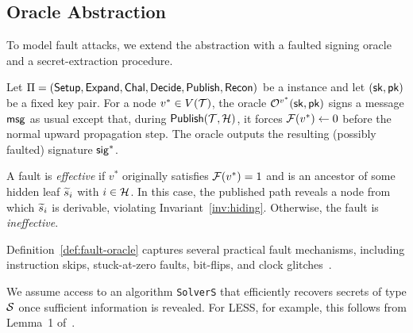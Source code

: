\subsection{Oracle Abstraction}
\label{sec:oracle}

To model fault attacks, we extend the \GZKST abstraction with a faulted signing oracle and a secret-extraction procedure.

\begin{definition}
\label{def:fault-oracle}
Let $\Pi=(\mathsf{Setup},\mathsf{Expand},\mathsf{Chal},\mathsf{Decide},\allowbreak
\mathsf{Publish},\allowbreak\mathsf{Recon})$ be a \GZKST
instance and let $(\mathsf{sk},\mathsf{pk})$ be a fixed key pair. For a node
$v^*\in V(\mathcal{T})$, the oracle $\mathcal{O}^{v^*}(\mathsf{sk},\mathsf{pk})$ signs a
message $\mathsf{msg}$ as usual except that, during
$\mathsf{Publish}(\mathcal{T},\mathcal{H})$, it forces
$\mathcal{F}(v^*) \leftarrow 0$
before the normal upward propagation step. The oracle outputs the
resulting (possibly faulted) signature $\mathsf{sig}^*$.
\end{definition}

A fault is \emph{effective} if $v^*$ originally satisfies
$\mathcal{F}(v^*)=1$ and is an ancestor of some hidden leaf
$\widetilde{s}_i$ with $i\in\mathcal{H}$. In this case, the published path
reveals a node from which $\widetilde{s}_i$ is derivable, violating
Invariant~\ref{inv:hiding}. Otherwise, the fault is
\emph{ineffective}.

\begin{remark}
Definition~\ref{def:fault-oracle} captures several practical fault
mechanisms, including instruction skips, stuck-at-zero faults,
bit-flips, and clock glitches~\cite{ZKFault,FaultToForge2025}.
\end{remark}

\begin{remark}
We assume access to an algorithm \texttt{SolverS} that efficiently
recovers secrets of type $\mathcal{S}$ once sufficient information is
revealed. For LESS, for example, this follows from
Lemma~1 of~\cite{ZKFault}.
\end{remark}

